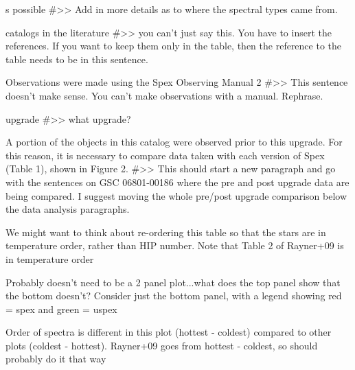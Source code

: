 



s possible
#>> Add in more details as to where the spectral types came from.

 catalogs in the literature
 #>> you can't just say this. You have to insert the references. If you want to keep them only in the table, then the reference to the table needs to be in this sentence.






Observations were made using the Spex Observing Manual 2
#>> This sentence doesn't make sense. You can't make observations with a manual. Rephrase.

upgrade
#>> what upgrade?


A portion of the objects in this catalog were observed prior to this upgrade. For this reason, it is necessary to compare data taken with each version of Spex (Table 1), shown in Figure 2.
#>> This should start a new paragraph and go with the sentences on GSC 06801-00186 where the pre and post upgrade data are being compared. I suggest moving the whole pre/post upgrade comparison below the data analysis paragraphs.



We might want to think about re-ordering this table so that the stars are in temperature order, rather than HIP number. Note that Table 2 of Rayner+09 is in temperature order

Probably doesn’t need to be a 2 panel plot...what does the top panel show that the bottom doesn’t? Consider just the bottom panel, with a legend showing red = spex and green = uspex

Order of spectra is different in this plot (hottest - coldest) compared to other plots (coldest - hottest). Rayner+09 goes from hottest - coldest, so should probably do it that way